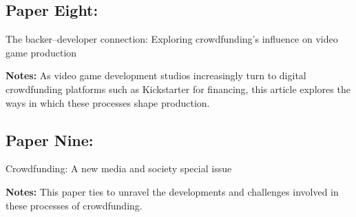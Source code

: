 \documentclass{scrartcl}
\begin{document}
\subsection{Paper Eight:}
The backer–developer connection: Exploring crowdfunding's influence on video game production
\cite{smith2014}

\textbf{Notes:}
As video game development studios increasingly turn to digital crowdfunding platforms such as Kickstarter for financing, this article explores the ways in which these processes shape production.

\subsection{Paper Nine:}
Crowdfunding: A new media and society special issue
\cite{bennett2014}

\textbf{Notes:}
This paper ties to unravel the developments and challenges involved in these processes of crowdfunding.





\end{document}
